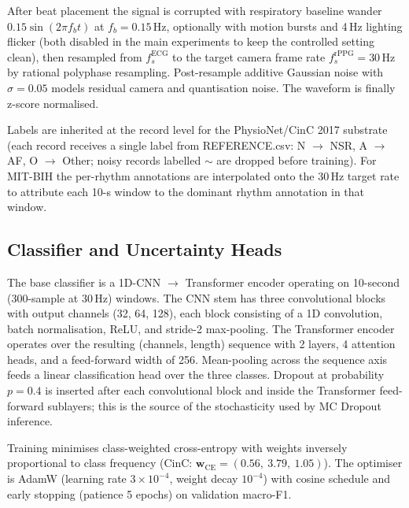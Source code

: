 \documentclass[journal]{IEEEtran}
\begin{document}
After beat placement the signal is corrupted with respiratory baseline wander $0.15 \sin(2\pi f_b t)$ at $f_b = 0.15$\,Hz, optionally with motion bursts and 4\,Hz lighting flicker (both disabled in the main experiments to keep the controlled setting clean), then resampled from $f_s^{\text{ECG}}$ to the target camera frame rate $f_s^{\text{rPPG}} = 30$\,Hz by rational polyphase resampling. Post-resample additive Gaussian noise with $\sigma = 0.05$ models residual camera and quantisation noise. The waveform is finally z-score normalised.

Labels are inherited at the record level for the PhysioNet/CinC 2017 substrate (each record receives a single label from REFERENCE.csv: N $\to$ NSR, A $\to$ AF, O $\to$ Other; noisy records labelled $\sim$ are dropped before training). For MIT-BIH the per-rhythm annotations are interpolated onto the 30\,Hz target rate to attribute each 10-s window to the dominant rhythm annotation in that window.

\subsection{Classifier and Uncertainty Heads}
The base classifier is a 1D-CNN $\to$ Transformer encoder operating on 10-second (300-sample at 30\,Hz) windows. The CNN stem has three convolutional blocks with output channels (32, 64, 128), each block consisting of a 1D convolution, batch normalisation, ReLU, and stride-2 max-pooling. The Transformer encoder operates over the resulting (channels, length) sequence with 2 layers, 4 attention heads, and a feed-forward width of 256. Mean-pooling across the sequence axis feeds a linear classification head over the three classes. Dropout at probability $p = 0.4$ is inserted after each convolutional block and inside the Transformer feed-forward sublayers; this is the source of the stochasticity used by MC Dropout inference.

Training minimises class-weighted cross-entropy with weights inversely proportional to class frequency (CinC: $\mathbf{w}_{\text{CE}} = (0.56,\ 3.79,\ 1.05)$). The optimiser is AdamW (learning rate $3\times10^{-4}$, weight decay $10^{-4}$) with cosine schedule and early stopping (patience 5 epochs) on validation macro-F1.
\end{document}

